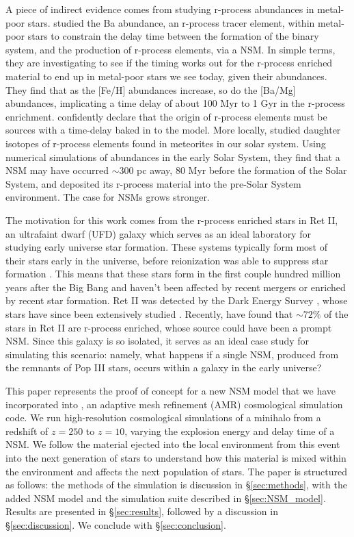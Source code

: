 \documentclass[fleqn,usenatbib]{mnras}
\begin{document}
A piece of indirect evidence comes from studying r-process abundances in metal-poor stars. \citet{Tarumi21} studied the Ba abundance, an r-process tracer element, within metal-poor stars to constrain the delay time between the formation of the binary system, and the production of r-process elements, via a NSM. In simple terms, they are investigating to see if the timing works out for the r-process enriched material to end up in metal-poor stars we see today, given their abundances. They find that as the [Fe/H] abundances increase, so do the [Ba/Mg] abundances, implicating a time delay of about 100 Myr to 1 Gyr in the r-process enrichment. \citet{Tarumi21} confidently declare that the origin of r-process elements must be sources with a time-delay baked in to the model. More locally, \citet{Bartos19} studied daughter isotopes of r-process elements found in meteorites in our solar system. Using numerical simulations of abundances in the early Solar System, they find that a NSM may have occurred $\sim 300$ pc away, 80 Myr before the formation of the Solar System, and deposited its r-process material into the pre-Solar System environment. The case for NSMs grows stronger.

The motivation for this work comes from the r-process enriched stars in Ret II, an ultrafaint dwarf (UFD) galaxy which serves as an ideal laboratory for studying early universe star formation. These systems typically form most of their stars early in the universe, before reionization was able to suppress star formation \citep{Weisz14}. This means that these stars form in the first couple hundred million years after the Big Bang and haven't been affected by recent mergers or enriched by recent star formation. Ret II was detected by the Dark Energy Survey \citep{Bechtol15}, whose stars have since been extensively studied \citep{Simon15, Roederer16, Ji16, Ji22}. Recently, \citet{Ji22} have found that $\sim 72\%$ of the stars in Ret II are r-process enriched, whose source could have been a prompt NSM. Since this galaxy is so isolated, it serves as an ideal case study for simulating this scenario: namely, what happens if a single NSM, produced from the remnants of Pop III stars, occurs within a galaxy in the early universe?

This paper represents the proof of concept for a new NSM model that we have incorporated into \enzo{}, an adaptive mesh refinement (AMR) cosmological simulation code. We run high-resolution cosmological simulations of a minihalo from a redshift of $z = 250$ to $z = 10$, varying the explosion energy and delay time of a NSM. We follow the material ejected into the local environment from this event into the next generation of stars to understand how this material is mixed within the environment and affects the next population of stars. The paper is structured as follows: the methods of the simulation is discussion in \S \ref{sec:methods}, with the added NSM model and the simulation suite described in \S \ref{sec:NSM_model}. Results are presented in \S \ref{sec:results}, followed by a discussion in \S \ref{sec:discussion}. We conclude with \S \ref{sec:conclusion}.
\end{document}

